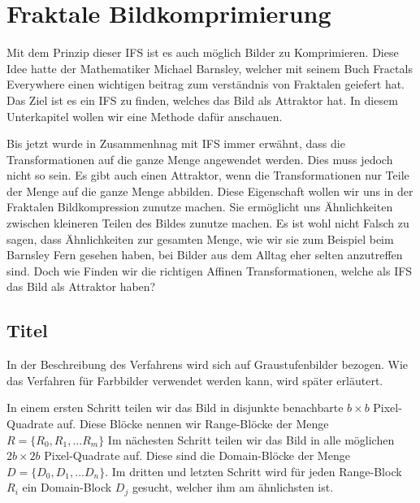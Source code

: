 %
%
%
\section{Fraktale Bildkomprimierung
\label{ifs:section:teil3}}
Mit dem Prinzip dieser IFS ist es auch möglich Bilder zu Komprimieren.
Diese Idee hatte der Mathematiker Michael Barnsley, welcher mit seinem Buch Fractals Everywhere einen wichtigen beitrag zum verständnis von Fraktalen geiefert hat.
Das Ziel ist es ein IFS zu finden, welches das Bild als Attraktor hat.
In diesem Unterkapitel wollen wir eine Methode dafür anschauen.


Bis jetzt wurde in Zusammenhnag mit IFS immer erwähnt, dass die Transformationen auf die ganze Menge angewendet werden.
Dies muss jedoch nicht so sein. 
Es gibt auch einen Attraktor, wenn die Transformationen nur Teile der Menge auf die ganze Menge abbilden.
Diese Eigenschaft wollen wir uns in der Fraktalen Bildkompression zunutze machen.
Sie ermöglicht uns Ähnlichkeiten zwischen kleineren Teilen des Bildes zunutze machen.
Es ist wohl nicht Falsch zu sagen, dass Ähnlichkeiten zur gesamten Menge, wie wir sie zum Beispiel beim Barnsley Fern gesehen haben, bei Bilder aus dem Alltag eher selten anzutreffen sind.
Doch wie Finden wir die richtigen Affinen Transformationen, welche als IFS das Bild als Attraktor haben?

\subsection{Titel
\label{ifs:subsection:malorum}}
In der Beschreibung des Verfahrens wird sich auf Graustufenbilder bezogen. Wie das Verfahren für Farbbilder verwendet werden kann, wird später erläutert.

In einem ersten Schritt teilen wir das Bild in disjunkte benachbarte $b \times b$ Pixel-Quadrate auf. Diese Blöcke nennen wir Range-Blöcke der Menge $R=\{R_0,R_1,...R_m\}$
Im nächesten Schritt teilen wir das Bild in alle möglichen $2b \times 2b$ Pixel-Quadrate auf. Diese sind die Domain-Blöcke der Menge $D = \{D_0,D_1,...D_n\}$. 
Im dritten und letzten Schritt wird für jeden Range-Block $R_i$ ein Domain-Block $D_j$ gesucht, welcher ihm am ähnlichsten ist.

